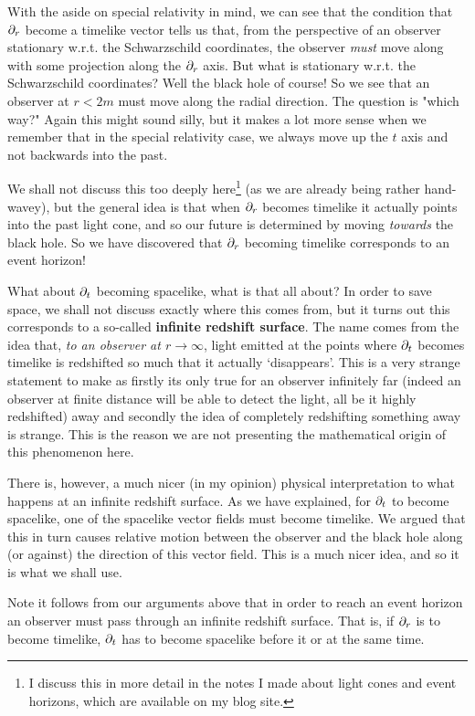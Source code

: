 With the aside on special relativity in mind, we can see that the condition that $\partial_r$ become a timelike vector tells us that, from the perspective of an observer stationary w.r.t. the Schwarzschild coordinates, the observer \textit{must} move along with some projection along the $\partial_r$ axis. But what is stationary w.r.t. the Schwarzschild coordinates? Well the black hole of course! So we see that an observer at $r<2m$ must move along the radial direction. The question is "which way?" Again this might sound silly, but it makes a lot more sense when we remember that in the special relativity case, we always move up the $t$ axis and not backwards into the past. 

We shall not discuss this too deeply here\footnote{I discuss this in more detail in the notes I made about light cones and event horizons, which are available on my blog site.} (as we are already being rather hand-wavey), but the general idea is that when $\partial_r$ becomes timelike it actually points into the past light cone, and so our future is determined by moving \textit{towards} the black hole. So we have discovered that $\partial_r$ becoming timelike corresponds to an event horizon! 

What about $\partial_t$ becoming spacelike, what is that all about? In order to save space, we shall not discuss exactly where this comes from, but it turns out this corresponds to a so-called \textbf{infinite redshift surface}. The name comes from the idea that, \textit{to an observer at $r\to\infty$}, light emitted at the points where $\partial_t$ becomes timelike is redshifted so much that it actually `disappears'. This is a very strange statement to make as firstly its only true for an observer infinitely far (indeed an observer at finite distance will be able to detect the light, all be it highly redshifted) away and secondly the idea of completely redshifting something away is strange. This is the reason we are not presenting the mathematical origin of this phenomenon here. 

There is, however, a much nicer (in my opinion) physical interpretation to what happens at an infinite redshift surface. As we have explained, for $\partial_t$ to become spacelike, one of the spacelike vector fields must become timelike. We argued that this in turn causes relative motion between the observer and the black hole along (or against) the direction of this vector field. This is a much nicer idea, and so it is what we shall use. 

\br 
    Note it follows from our arguments above that in order to reach an event horizon an observer must pass through an infinite redshift surface. That is, if $\partial_r$ is to become timelike, $\partial_t$ has to become spacelike before it or at the same time. 
\er 

